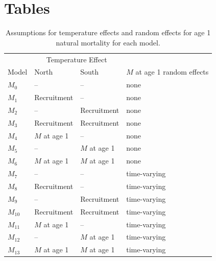 \documentclass[
]{article}
\begin{document}
\clearpage

\hypertarget{tables}{%
\section*{Tables}\label{tables}}

\setcounter{table}{0}
\renewcommand\thetable{\arabic{table}}

\begin{table}

\caption{\label{tab:model-desc-table}Assumptions for temperature effects and random effects for age 1 natural mortality for each model.}
\centering
\begin{tabular}[t]{llll}
\toprule
\multicolumn{1}{c}{ } & \multicolumn{2}{c}{Temperature Effect} & \multicolumn{1}{c}{ } \\
\cmidrule(l{3pt}r{3pt}){2-3}
Model & North & South & $M$ at age 1 random effects\\
\midrule
$M_{0}$ & -- & -- & none\\
$M_{1}$ & Recruitment & -- & none\\
$M_{2}$ & -- & Recruitment & none\\
$M_{3}$ & Recruitment & Recruitment & none\\
$M_{4}$ & $M$ at age 1 & -- & none\\
\addlinespace
$M_{5}$ & -- & $M$ at age 1 & none\\
$M_{6}$ & $M$ at age 1 & $M$ at age 1 & none\\
$M_{7}$ & -- & -- & time-varying\\
$M_{8}$ & Recruitment & -- & time-varying\\
$M_{9}$ & -- & Recruitment & time-varying\\
\addlinespace
$M_{10}$ & Recruitment & Recruitment & time-varying\\
$M_{11}$ & $M$ at age 1 & -- & time-varying\\
$M_{12}$ & -- & $M$ at age 1 & time-varying\\
$M_{13}$ & $M$ at age 1 & $M$ at age 1 & time-varying\\
\bottomrule
\end{tabular}
\end{table}
\end{document}
